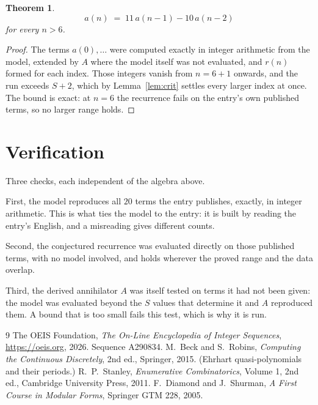 \documentclass[11pt,a4paper]{article}
\theoremstyle{plain}
\newtheorem{theorem}{Theorem}
\theoremstyle{definition}
\begin{document}
\begin{theorem}
\[
a(n)\;=\;11\,a(n-1) - 10\,a(n-2)
\]
for every $n>6$.
\end{theorem}

\begin{proof}
The terms $a(0),\dots$ were computed exactly in integer arithmetic from the model, extended by
$A$ where the model itself was not evaluated, and $r(n)$ formed for each index. Those integers
vanish from $n=6+1$ onwards, and the run exceeds $S+2$, which by
Lemma~\ref{lem:crit} settles every larger index at once. The bound is exact: at $n=6$ the recurrence fails on the entry's own published terms, so no larger range holds.
\end{proof}

\section{Verification}

Three checks, each independent of the algebra above.

First, the model reproduces all $20$ terms the entry publishes, exactly, in integer
arithmetic. This is what ties the model to the entry: it is built by reading the entry's
English, and a misreading gives different counts.

Second, the conjectured recurrence was evaluated directly on those published terms, with no
model involved, and holds wherever the proved range and the data overlap.

Third, the derived annihilator $A$ was itself tested on terms it had not been given: the model
was evaluated beyond the $S$ values that determine it and $A$ reproduced them. A bound that is
too small fails this test, which is why it is run.

\begin{thebibliography}{9}
 The OEIS Foundation, \emph{The On-Line Encyclopedia of Integer
Sequences}, \url{https://oeis.org}, 2026. Sequence A290834.
 M.~Beck and S.~Robins, \emph{Computing the Continuous Discretely},
2nd ed., Springer, 2015. (Ehrhart quasi-polynomials and their periods.)
 R.~P.~Stanley, \emph{Enumerative Combinatorics}, Volume 1, 2nd ed.,
Cambridge University Press, 2011.
 F.~Diamond and J.~Shurman, \emph{A First Course in Modular Forms},
Springer GTM 228, 2005.
\end{thebibliography}
\end{document}
